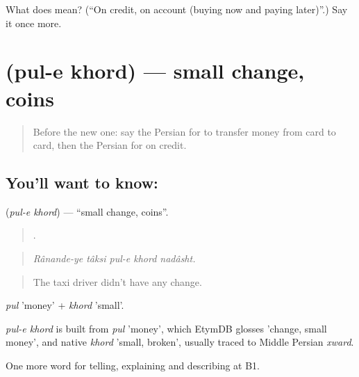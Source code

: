 \begin{tcolorbox}[breakable,colback=teal!4,colframe=teal!35!black,title={Before you move on}]
What does  mean? (\textquotedblleft{}On credit, on account (buying now and paying later)\textquotedblright{}.) Say it once more.
\end{tcolorbox}
\section[\texorpdfstring{\fa{پول} \fa{خرد} (pul-e khord)}{پول خرد (pul-e khord)}]{  (pul-e khord) — small change, coins}

\label{lesson:FA-C461-pul-e-khord}



\begin{quote}
Before the new one: say the Persian for to transfer money from card to card, then the Persian for on credit.
\end{quote}

\subsection*{You'll want to know:  }
\textbf{ } (\emph{pul-e khord}) — \textquotedblleft{}small change, coins\textquotedblright{}.

\begin{quote}
    .
\end{quote}

\begin{quote}
\emph{Rânande-ye tâksi pul-e khord nadâsht.}
\end{quote}

\begin{quote}
The taxi driver didn't have any change.
\end{quote}

\emph{pul} 'money' + \emph{khord} 'small'.

\begin{cousinweb}
\emph{pul-e khord} is built from \emph{pul} 'money', which EtymDB glosses 'change, small money', and native \emph{khord} 'small, broken', usually traced to Middle Persian \emph{xward}.
\end{cousinweb}

\begin{grammarlens}[title={What you've built}]
One more word for telling, explaining and describing at B1.
\end{grammarlens}

